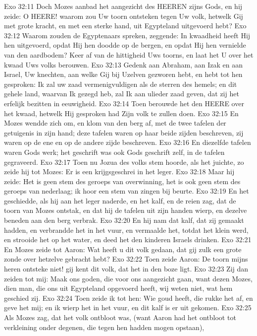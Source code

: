 Exo 32:11  Doch Mozes aanbad het aangezicht des HEEREN zijns Gods, en hij zeide: O HEERE! waarom zou Uw toorn ontsteken tegen Uw volk, hetwelk Gij met grote kracht, en met een sterke hand, uit Egypteland uitgevoerd hebt?
Exo 32:12  Waarom zouden de Egyptenaars spreken, zeggende: In kwaadheid heeft Hij hen uitgevoerd, opdat Hij hen doodde op de bergen, en opdat Hij hen vernielde van den aardbodem? Keer af van de hittigheid Uws toorns, en laat het U over het kwaad Uws volks berouwen.
Exo 32:13  Gedenk aan Abraham, aan Izak en aan Israel, Uw knechten, aan welke Gij bij Uzelven gezworen hebt, en hebt tot hen gesproken: Ik zal uw zaad vermenigvuldigen als de sterren des hemels; en dit gehele land, waarvan Ik gezegd heb, zal Ik aan ulieder zaad geven, dat zij het erfelijk bezitten in eeuwigheid.
Exo 32:14  Toen berouwde het den HEERE over het kwaad, hetwelk Hij gesproken had Zijn volk te zullen doen.
Exo 32:15  En Mozes wendde zich om, en klom van den berg af, met de twee tafelen der getuigenis in zijn hand; deze tafelen waren op haar beide zijden beschreven, zij waren op de ene en op de andere zijde beschreven.
Exo 32:16  En diezelfde tafelen waren Gods werk; het geschrift was ook Gods geschrift zelf, in de tafelen gegraveerd.
Exo 32:17  Toen nu Jozua des volks stem hoorde, als het juichte, zo zeide hij tot Mozes: Er is een krijgsgeschrei in het leger.
Exo 32:18  Maar hij zeide: Het is geen stem des geroeps van overwinning, het is ook geen stem des geroeps van nederlaag; ik hoor een stem van zingen bij beurte.
Exo 32:19  En het geschiedde, als hij aan het leger naderde, en het kalf, en de reien zag, dat de toorn van Mozes ontstak, en dat hij de tafelen uit zijn handen wierp, en dezelve beneden aan den berg verbrak.
Exo 32:20  En hij nam dat kalf, dat zij gemaakt hadden, en verbrandde het in het vuur, en vermaalde het, totdat het klein werd, en strooide het op het water, en deed het den kinderen Israels drinken.
Exo 32:21  En Mozes zeide tot Aaron: Wat heeft u dit volk gedaan, dat gij zulk een grote zonde over hetzelve gebracht hebt?
Exo 32:22  Toen zeide Aaron: De toorn mijns heren ontsteke niet! gij kent dit volk, dat het in den boze ligt.
Exo 32:23  Zij dan zeiden tot mij: Maak ons goden, die voor ons aangezicht gaan, want dezen Mozes, dien man, die ons uit Egypteland opgevoerd heeft, wij weten niet, wat hem geschied zij.
Exo 32:24  Toen zeide ik tot hen: Wie goud heeft, die rukke het af, en geve het mij; en ik wierp het in het vuur, en dit kalf is er uit gekomen.
Exo 32:25  Als Mozes zag, dat het volk ontbloot was, (want Aaron had het ontbloot tot verkleining onder degenen, die tegen hen hadden mogen opstaan),
